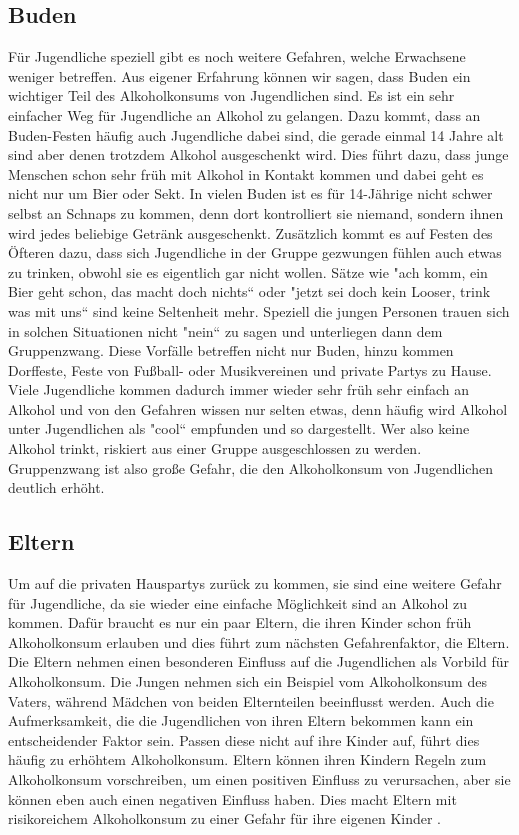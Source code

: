 \documentclass[12pt]{article}
\begin{document}
\subsection{Buden}
Für Jugendliche speziell gibt es noch weitere Gefahren, welche Erwachsene weniger betreffen. Aus eigener Erfahrung können wir sagen, dass Buden ein wichtiger Teil des Alkoholkonsums von Jugendlichen sind. Es ist ein sehr einfacher Weg für Jugendliche an Alkohol zu gelangen. Dazu kommt, dass an Buden-Festen häufig auch Jugendliche dabei sind, die gerade einmal 14 Jahre alt sind aber denen trotzdem Alkohol ausgeschenkt wird. Dies führt dazu, dass junge Menschen schon sehr früh mit Alkohol in Kontakt kommen und dabei geht es nicht nur um Bier oder Sekt. In vielen Buden ist es für 14-Jährige nicht schwer selbst an Schnaps zu kommen, denn dort kontrolliert sie niemand, sondern ihnen wird jedes beliebige Getränk ausgeschenkt. Zusätzlich kommt es auf Festen des Öfteren dazu, dass sich Jugendliche in der Gruppe gezwungen fühlen auch etwas zu trinken, obwohl sie es eigentlich gar nicht wollen. Sätze wie "ach komm, ein Bier geht schon, das macht doch nichts“ oder "jetzt sei doch kein Looser, trink was mit uns“ sind keine Seltenheit mehr. Speziell die jungen Personen trauen sich in solchen Situationen nicht "nein“ zu sagen und unterliegen dann dem Gruppenzwang. Diese Vorfälle betreffen nicht nur Buden, hinzu kommen Dorffeste, Feste von Fußball- oder Musikvereinen und private Partys zu Hause. Viele Jugendliche kommen dadurch immer wieder sehr früh sehr einfach an Alkohol und von den Gefahren wissen nur selten etwas, denn häufig wird Alkohol unter Jugendlichen als "cool“ empfunden und so dargestellt. Wer also keine Alkohol trinkt, riskiert aus einer Gruppe ausgeschlossen zu werden. Gruppenzwang ist also große Gefahr, die den Alkoholkonsum von Jugendlichen deutlich erhöht.\\
\subsection{Eltern}
Um auf die privaten Hauspartys zurück zu kommen, sie sind eine weitere Gefahr für Jugendliche, da sie wieder eine einfache Möglichkeit sind an Alkohol zu kommen. Dafür braucht es nur ein paar Eltern, die ihren Kinder schon früh Alkoholkonsum erlauben und dies führt zum nächsten Gefahrenfaktor, die Eltern. Die Eltern nehmen einen besonderen Einfluss auf die Jugendlichen als Vorbild für Alkoholkonsum. Die Jungen nehmen sich ein Beispiel vom Alkoholkonsum des Vaters, während Mädchen von beiden Elternteilen beeinflusst werden. Auch die Aufmerksamkeit, die die Jugendlichen von ihren Eltern bekommen kann ein entscheidender Faktor sein. Passen diese nicht auf ihre Kinder auf, führt dies häufig zu erhöhtem Alkoholkonsum. Eltern können ihren Kindern Regeln zum Alkoholkonsum vorschreiben, um einen positiven Einfluss zu verursachen, aber sie können eben auch einen negativen Einfluss haben. Dies macht Eltern mit risikoreichem Alkoholkonsum zu einer Gefahr für ihre eigenen Kinder \autocite[27]{kuhn_empfehlungen_nodate}. \\
\end{document}
